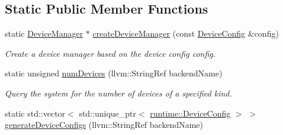 \subsection*{Static Public Member Functions}
\begin{DoxyCompactItemize}
\item 
\mbox{\label{classglow_1_1runtime_1_1_device_manager_a3e68dafd3ed5d97930301a02b13a7a8a}} 
static \hyperlink{classglow_1_1runtime_1_1_device_manager}{Device\+Manager} $\ast$ \hyperlink{classglow_1_1runtime_1_1_device_manager_a3e68dafd3ed5d97930301a02b13a7a8a}{create\+Device\+Manager} (const \hyperlink{structglow_1_1runtime_1_1_device_config}{Device\+Config} \&config)
\begin{DoxyCompactList}\small\item\em Create a device manager based on the device config {\ttfamily config}. \end{DoxyCompactList}\item 
\mbox{\label{classglow_1_1runtime_1_1_device_manager_ab3ff4fec5795590f9ad2765ae1d415af}} 
static unsigned \hyperlink{classglow_1_1runtime_1_1_device_manager_ab3ff4fec5795590f9ad2765ae1d415af}{num\+Devices} (llvm\+::\+String\+Ref backend\+Name)
\begin{DoxyCompactList}\small\item\em Query the system for the number of devices of a specified kind. \end{DoxyCompactList}\item 
static std\+::vector$<$ std\+::unique\+\_\+ptr$<$ \hyperlink{structglow_1_1runtime_1_1_device_config}{runtime\+::\+Device\+Config} $>$ $>$ \hyperlink{classglow_1_1runtime_1_1_device_manager_a3ba362bdcfcc16c652cf1fdd769291db}{generate\+Device\+Configs} (llvm\+::\+String\+Ref backend\+Name)
\end{DoxyCompactItemize}
